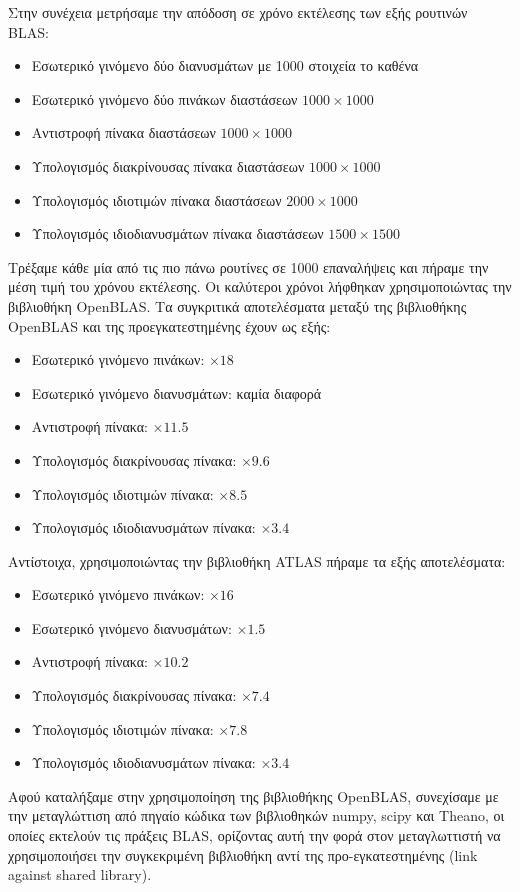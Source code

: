 Στην συνέχεια μετρήσαμε την απόδοση σε χρόνο εκτέλεσης των εξής ρουτινών BLAS:
\begin{itemize}
  \item{Εσωτερικό γινόμενο δύο διανυσμάτων με 1000 στοιχεία το καθένα}
  \item{Εσωτερικό γινόμενο δύο πινάκων διαστάσεων $1000 \times 1000$}
  \item{Αντιστροφή πίνακα διαστάσεων $1000 \times 1000$}
  \item{Υπολογισμός διακρίνουσας πίνακα διαστάσεων $1000 \times 1000$}
  \item{Υπολογισμός ιδιοτιμών πίνακα διαστάσεων $2000 \times 1000$}
  \item{Υπολογισμός ιδιοδιανυσμάτων πίνακα διαστάσεων $1500 \times 1500$}
\end{itemize}
Τρέξαμε κάθε μία από τις πιο πάνω ρουτίνες σε 1000 επαναλήψεις και πήραμε
την μέση τιμή του χρόνου εκτέλεσης.
Οι καλύτεροι χρόνοι λήφθηκαν χρησιμοποιώντας την βιβλιοθήκη OpenBLAS.
Τα συγκριτικά αποτελέσματα μεταξύ της βιβλιοθήκης OpenBLAS και της προεγκατεστημένης
έχουν ως εξής:
\begin{itemize}
  \item{Εσωτερικό γινόμενο πινάκων: $\times 18$}
  \item{Εσωτερικό γινόμενο διανυσμάτων: καμία διαφορά}
  \item{Αντιστροφή πίνακα: $\times 11.5$}
  \item{Υπολογισμός διακρίνουσας πίνακα: $\times 9.6$}
  \item{Υπολογισμός ιδιοτιμών πίνακα: $\times 8.5$}
  \item{Υπολογισμός ιδιοδιανυσμάτων πίνακα: $\times 3.4$}
\end{itemize}
Αντίστοιχα, χρησιμοποιώντας την βιβλιοθήκη ATLAS πήραμε τα εξής αποτελέσματα:
\begin{itemize}
  \item{Εσωτερικό γινόμενο πινάκων: $\times 16$}
  \item{Εσωτερικό γινόμενο διανυσμάτων: $\times 1.5$}
  \item{Αντιστροφή πίνακα: $\times 10.2$}
  \item{Υπολογισμός διακρίνουσας πίνακα: $\times 7.4$}
  \item{Υπολογισμός ιδιοτιμών πίνακα: $\times 7.8$}
  \item{Υπολογισμός ιδιοδιανυσμάτων πίνακα: $\times 3.4$}
\end{itemize}

Αφού καταλήξαμε στην χρησιμοποίηση της βιβλιοθήκης OpenBLAS, συνεχίσαμε
με την μεταγλώττιση από πηγαίο κώδικα των βιβλιοθηκών numpy, scipy και Theano,
οι οποίες εκτελούν τις πράξεις BLAS, ορίζοντας αυτή την φορά στον μεταγλωττιστή
να χρησιμοποιήσει την συγκεκριμένη βιβλιοθήκη αντί της προ-εγκατεστημένης (link against shared library).


